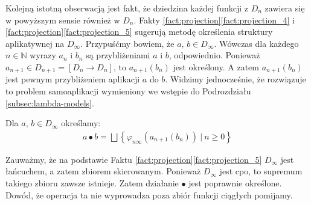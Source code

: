 Kolejną istotną obserwacją jest fakt, że dziedzina każdej funkcji z \(D_n\) zawiera się w powyższym sensie również w \(D_n\). Fakty \ref{fact:projection}\ref{fact:projection_4} i \ref{fact:projection}\ref{fact:projection_5} sugerują metodę określenia struktury aplikatywnej na \(D_\infty\). Przypuśćmy bowiem, że \(a,\,b\in D_\infty\). Wówczas dla każdego \(n\in\mathbb{N}\) wyrazy \(a_n\) i \(b_n\) są przybliżeniami \(a\) i \(b\), odpowiednio. Ponieważ \(a_{n+1}\in  D_{n+1}=[D_n\to D_n]\), to \(a_{n+1}(b_n)\) jest określony. A zatem \(a_{n+1}(b_n)\) jest pewnym przybliżeniem aplikacji \(a\) do \(b\). Widzimy jednocześnie, że rozwiązuje to problem samoaplikacji wymieniony we wstępie do Podrozdziału \ref{subsec:lambda-models}. 

\begin{definicja}%
  Dla \(a,\,b\in D_\infty\) określamy:
\begin{align*}
a \bullet b = \bigsqcup\left\{\varphi_{n\infty}(a_{n+1}(b_n))\ |\ n\geq 0\right\}%
\end{align*}
\end{definicja}

Zauważmy, że na podstawie Faktu \ref{fact:projection}\ref{fact:projection_5} \(D_\infty\) jest łańcuchem, a zatem zbiorem skierowanym. Ponieważ \(D_\infty\) jest cpo, to supremum takiego zbioru zawsze istnieje. Zatem działanie \(\bullet\) jest poprawnie określone.
Dowód, że operacja ta nie wyprowadza poza zbiór funkcji ciągłych pomijamy. 



